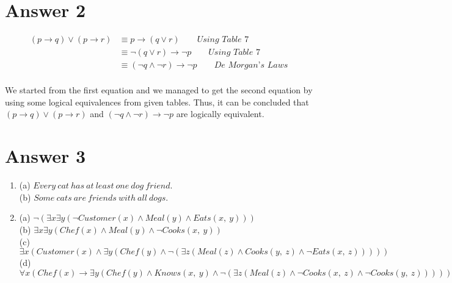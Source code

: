 \documentclass[12pt]{article}
\begin{document}
\section*{Answer 2}

\vspace{10px}

\begin{equation} 
\label{eq1}
\begin{split}
(p \rightarrow q) \lor (p \rightarrow r) & \equiv p \rightarrow (q \lor r) \qquad \textit{Using Table 7} \\
& \equiv \neg(q \lor r) \rightarrow \neg p \qquad \textit{Using Table 7} \\
& \equiv (\neg q \land \neg r) \rightarrow \neg p \qquad \textit{De Morgan's Laws} \\
\end{split}
\end{equation}

We started from the first equation and we managed to get the second equation by using some logical equivalences from given tables. Thus, it can be concluded that $(p \rightarrow q) \lor (p \rightarrow r)$ and $(\neg q \land \neg r) \rightarrow \neg p$ are logically equivalent.



\section*{Answer 3}

\vspace{10px}

\begin{enumerate}
	\item (a) $Every \ cat \ has \ at \ least \ one \ dog \ friend.$  \\ (b) $Some \ cats \ are \ friends \ with \ all \ dogs.$
	\item
	(a) $\neg (\exists x \exists y (\neg Customer(x) \land Meal(y) \land Eats(x,\ y)))$ \\
	(b) $\exists x \exists y (Chef(x) \land Meal(y) \land \neg Cooks(x,\ y))$ \\
	(c) $\exists x (Customer(x) \land \exists y(Chef(y) \land \neg (\exists z (Meal(z) \land Cooks(y,\ z) \land \neg Eats(x,\ z)))))$ \\
	(d) $\forall x (Chef(x) \rightarrow \exists y (Chef(y) \land Knows(x,\ y) \land \neg (\exists z (Meal(z) \land \neg Cooks(x,\ z) \land \neg Cooks(y,\ z)))))$
\end{enumerate}
\end{document}
